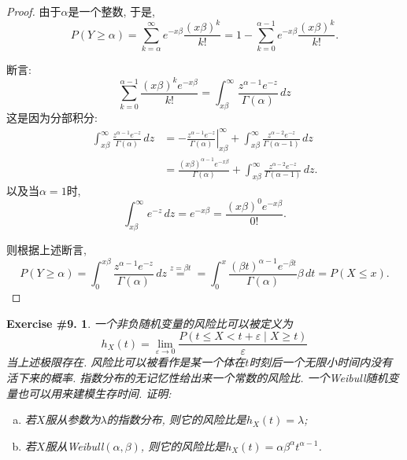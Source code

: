 \documentclass[UTF8, a4paper]{article}
\newtheorem{exercise}{Exercise \#9.}
\begin{document}
\begin{proof}


由于\(\alpha\)是一个整数, 
于是, 
$$
P(Y\geq \alpha) = \sum_{k = \alpha}^{\infty} e^{-x\beta} \frac{(x\beta)^k}{k!} = 1 - \sum_{k = 0}^{\alpha - 1} e^{-x\beta} \frac{(x\beta)^k}{k!}.
$$

断言: 
$$
\sum_{k=0}^{\alpha - 1} \frac{(x\beta)^k e^{-x\beta}}{k!} = \int_{x\beta}^{\infty} \frac{z^{\alpha - 1} e^{-z}}{\Gamma(\alpha)} \, dz
$$
这是因为分部积分:
$$
\begin{aligned}
    \int_{x\beta}^{\infty} \frac{z^{\alpha - 1} e^{-z}}{\Gamma(\alpha)} \, dz &= \left. -\frac{z^{\alpha - 1} e^{-z}}{\Gamma(\alpha)} \right|_{x\beta}^{\infty} + \int_{x\beta}^{\infty} \frac{z^{\alpha - 2} e^{-z}}{\Gamma(\alpha - 1)} \, dz \\
    &= \frac{(x\beta)^{\alpha - 1} e^{-x\beta}}{\Gamma(\alpha)} + \int_{x\beta}^{\infty} \frac{z^{\alpha - 2} e^{-z}}{\Gamma(\alpha - 1)} \, dz.
\end{aligned}
$$
以及当\(\alpha = 1\)时,
$$
\int_{x\beta}^{\infty} e^{-z} \,dz = e^{-x\beta} = \frac{(x\beta)^0 e^{-x\beta}}{0!}.
$$




则根据上述断言, 
$$
P(Y \geq \alpha) = \int_{0}^{x\beta} \frac{z^{\alpha - 1} e^{-z}}{\Gamma(\alpha)} \, dz \overset{z = \beta t}{=} = \int_{0}^{x} \frac{(\beta t)^{\alpha - 1} e^{-\beta t}}{\Gamma(\alpha)} \beta \, dt = P(X \leq x).
$$
\end{proof}

\begin{framed}
\begin{exercise}
一个非负随机变量的风险比可以被定义为
$$
h_X(t)=\lim _{\varepsilon \rightarrow 0} \frac{P(t \leq X<t+\varepsilon \mid X \geq t)}{\varepsilon}
$$
当上述极限存在.
风险比可以被看作是某一个体在\(t\)时刻后一个无限小时间内没有活下来的概率.
指数分布的无记忆性给出来一个常数的风险比. 一个Weibull随机变量也可以用来建模生存时间.
证明:
\begin{enumerate}[a)]
    \item 若\(X\)服从参数为\(\lambda\)的指数分布, 则它的风险比是\(h_X(t) = \lambda\);
    \item 若\(X\)服从Weibull\((\alpha, \beta)\), 则它的风险比是\(h_X(t) = \alpha \beta^\alpha t^{\alpha - 1}\).
\end{enumerate}
\end{exercise}
\end{framed}
\end{document}

